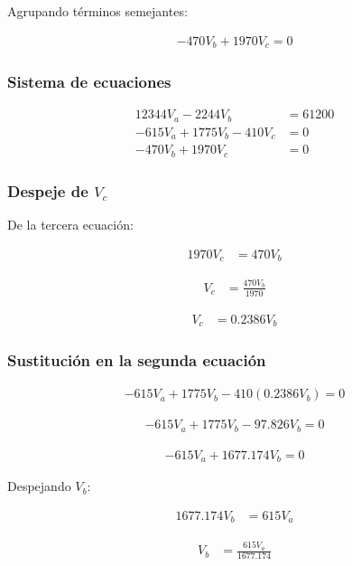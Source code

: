 \documentclass[conference]{IEEEtran}
\begin{document}
Agrupando términos semejantes:

\begin{align*}
-470V_b+1970V_c=0
\end{align*}

\subsubsection{Sistema de ecuaciones}

\begin{align*}
12344V_a-2244V_b&=61200 \\
-615V_a+1775V_b-410V_c&=0 \\
-470V_b+1970V_c&=0
\end{align*}

\subsubsection{Despeje de $V_c$}

De la tercera ecuación:

\begin{align*}
1970V_c&=470V_b
\end{align*}

\begin{align*}
V_c&=\frac{470V_b}{1970}
\end{align*}

\begin{align*}
V_c&=0.2386V_b
\end{align*}

\subsubsection{Sustitución en la segunda ecuación}

\begin{align*}
-615V_a+1775V_b-410(0.2386V_b)=0
\end{align*}

\begin{align*}
-615V_a+1775V_b-97.826V_b=0
\end{align*}

\begin{align*}
-615V_a+1677.174V_b=0
\end{align*}

Despejando $V_b$:

\begin{align*}
1677.174V_b&=615V_a
\end{align*}

\begin{align*}
V_b&=\frac{615V_a}{1677.174}
\end{align*}
\end{document}
